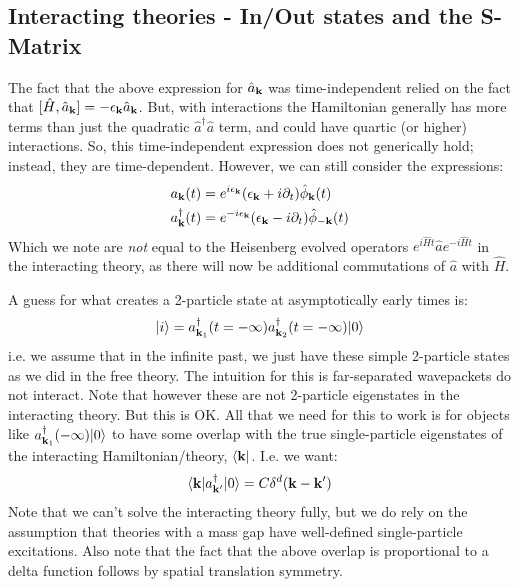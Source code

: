 \subsection{Interacting theories - In/Out states and the S-Matrix}
The fact that the above expression for $\hat{a}_{\mathbf{k}}$ was time-independent relied on the fact that $[\hat{H}, \hat{a}_{\mathbf{k}}] = -\epsilon_{\mathbf{k}}\hat{a}_{\mathbf{k}}$. But, with interactions the Hamiltonian generally has more terms than just the quadratic $\hat{a}^\dag\hat{a}$ term, and could have quartic (or higher) interactions. So, this time-independent expression does not generically hold; instead, they are time-dependent. However, we can still consider the expressions:
\begin{equation}
    \begin{split}
        a_{\mathbf{k}}(t) &= e^{i\epsilon_{\mathbf{k}}}(\epsilon_{\mathbf{k}} + i\partial_t)\hat{\phi}_{\mathbf{k}}(t)
        \\ a_{\mathbf{k}}^\dagger(t) &= e^{-i\epsilon_{\mathbf{k}}}(\epsilon_{\mathbf{k}} - i\partial_t)\hat{\phi}_{-\mathbf{k}}(t)
    \end{split}
\end{equation}
Which we note are \emph{not} equal to the Heisenberg evolved operators $e^{i\hat{H}t}\hat{a}e^{-i\hat{H}t}$ in the interacting theory, as there will now be additional commutations of $\hat{a}$ with $\hat{H}$.

A guess for what creates a 2-particle state at asymptotically early times is:
\begin{equation}
    \lvert i \rangle = a_{\mathbf{k}_1}^\dagger(t=-\infty)a_{\mathbf{k}_2}^\dagger(t=-\infty)\lvert 0 \rangle
\end{equation}
i.e. we assume that in the infinite past, we just have these simple 2-particle states as we did in the free theory. The intuition for this is far-separated wavepackets do not interact. Note that however these are not 2-particle eigenstates in the interacting theory. But this is OK. All that we need for this to work is for objects like $a^\dagger_{\mathbf{k}_1}(-\infty)\lvert 0 \rangle$ to have some overlap with the true single-particle eigenstates of the interacting Hamiltonian/theory, $\langle \mathbf{k} \rvert$. I.e. we want:
\begin{equation}
    \langle \mathbf{k} \rvert a^\dagger_{\mathbf{k}'}\lvert 0 \rangle = C\delta^d(\mathbf{k} - \mathbf{k}')
\end{equation}
Note that we can't solve the interacting theory fully, but we do rely on the assumption that theories with a mass gap have well-defined single-particle excitations. Also note that the fact that the above overlap is proportional to a delta function follows by spatial translation symmetry.

